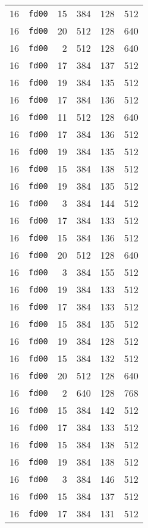 \documentclass{article}
\begin{document}
\begin{table}[h!]
\begin{tabular}{llrrrl}
    16 & \texttt{fd00} & 15 & 384 & 128 & 512 \\
    16 & \texttt{fd00} & 20 & 512 & 128 & 640 \\
    16 & \texttt{fd00} & 2 & 512 & 128 & 640 \\
    16 & \texttt{fd00} & 17 & 384 & 137 & 512 \\
    16 & \texttt{fd00} & 19 & 384 & 135 & 512 \\
    16 & \texttt{fd00} & 17 & 384 & 136 & 512 \\
    16 & \texttt{fd00} & 11 & 512 & 128 & 640 \\
    16 & \texttt{fd00} & 17 & 384 & 136 & 512 \\
    16 & \texttt{fd00} & 19 & 384 & 135 & 512 \\
    16 & \texttt{fd00} & 15 & 384 & 138 & 512 \\
    16 & \texttt{fd00} & 19 & 384 & 135 & 512 \\
    16 & \texttt{fd00} & 3 & 384 & 144 & 512 \\
    16 & \texttt{fd00} & 17 & 384 & 133 & 512 \\
    16 & \texttt{fd00} & 15 & 384 & 136 & 512 \\
    16 & \texttt{fd00} & 20 & 512 & 128 & 640 \\
    16 & \texttt{fd00} & 3 & 384 & 155 & 512 \\
    16 & \texttt{fd00} & 19 & 384 & 133 & 512 \\
    16 & \texttt{fd00} & 17 & 384 & 133 & 512 \\
    16 & \texttt{fd00} & 15 & 384 & 135 & 512 \\
    16 & \texttt{fd00} & 19 & 384 & 128 & 512 \\
    16 & \texttt{fd00} & 15 & 384 & 132 & 512 \\
    16 & \texttt{fd00} & 20 & 512 & 128 & 640 \\
    16 & \texttt{fd00} & 2 & 640 & 128 & 768 \\
    16 & \texttt{fd00} & 15 & 384 & 142 & 512 \\
    16 & \texttt{fd00} & 17 & 384 & 133 & 512 \\
    16 & \texttt{fd00} & 15 & 384 & 138 & 512 \\
    16 & \texttt{fd00} & 19 & 384 & 138 & 512 \\
    16 & \texttt{fd00} & 3 & 384 & 146 & 512 \\
    16 & \texttt{fd00} & 15 & 384 & 137 & 512 \\
    16 & \texttt{fd00} & 17 & 384 & 131 & 512 \\

\end{tabular}
\end{table}
\end{document}
